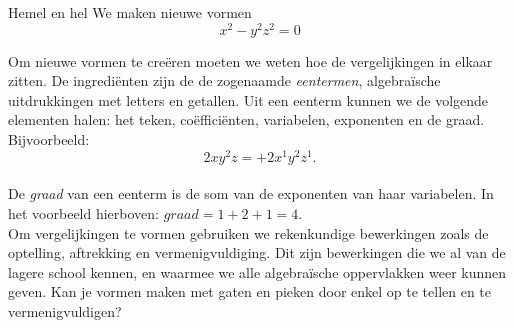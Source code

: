 \begin{surferPage}{Hemel en hel}
We maken nieuwe vormen \\
\smallskip
\[x^2	- y^2z^2	= 0\]

\singlespacing
Om nieuwe vormen te cre\"eren moeten we weten hoe de vergelijkingen in elkaar zitten. De ingredi\"enten zijn de de zogenaamde {\it eentermen}, algebra\"ische uitdrukkingen met letters en getallen.
\singlespacing
Uit een eenterm kunnen we de volgende elementen halen:
het teken, co\"effici\"enten, variabelen, exponenten en de graad.\\
\singlespacing
Bijvoorbeeld: 
\smallskip
\[2xy^2z = +2x^1y^2z^1.\]
\\
\smallskip
De  {\it graad} van een eenterm is de som van de exponenten van haar variabelen. In het voorbeeld hierboven: $graad = 1 + 2 + 1 = 4$.  \\
\singlespacing
Om vergelijkingen te vormen gebruiken we rekenkundige bewerkingen zoals de optelling, aftrekking en vermenigvuldiging. Dit zijn bewerkingen die we al van de lagere school kennen, en waarmee we alle algebra\"ische oppervlakken weer kunnen geven.
\singlespacing
Kan je vormen maken met gaten en pieken door enkel op te tellen en te vermenigvuldigen?
\end{surferPage}
